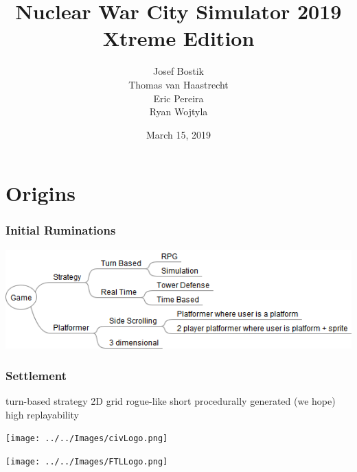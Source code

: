 \documentclass[ascpectratio=169]{beamer}
\title{Nuclear War City Simulator 2019 Xtreme Edition}
\author[]{Josef Bostik \\
  Thomas van Haastrecht \\
  Eric Pereira \\
  Ryan Wojtyla}
\date{March 15, 2019}
\begin{document}

\begin{frame}
  \titlepage
\end{frame}


\section{Origins}


\begin{frame}

  \frametitle{Initial Ruminations}

  \begin{center}
    \includegraphics[scale=0.5]{../../Diagrams/Game/Game.png}
  \end{center}

\end{frame}



\begin{frame}

  \frametitle{Settlement}

  \begin{multicols}{2}
    
  \begin{outline}
    \1 turn-based strategy
    \1 2D grid
    \1 rogue-like
      \2 short
      \2 procedurally generated (we hope)
      \2 high replayability
  \end{outline}

  \columnbreak

  \begin{center}
    \texttt{[image: ../../Images/civLogo.png]}
  \end{center}

  \begin{center}
    \texttt{[image: ../../Images/FTLLogo.png]}
  \end{center}

  \end{multicols}

\end{frame}
\end{document}
